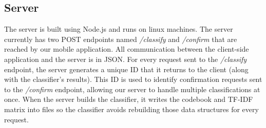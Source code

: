 \subsection{Server}
The server is built using Node.js and runs on linux machines. The server currently has two POST endpoints named \textit{/classify} and \textit{/confirm} that are reached by our mobile application. All communication between the client-side application and the server is in JSON. For every request sent to the \textit{/classify} endpoint, the server generates a unique ID that it returns to the client (along with the classifier's results). This ID is used to identify confirmation requests sent to the \textit{/confirm} endpoint, allowing our server to handle multiple classifications at once. When the server builds the classifier, it writes the codebook and TF-IDF matrix into files so the classifier avoids rebuilding those data structures for every request.
